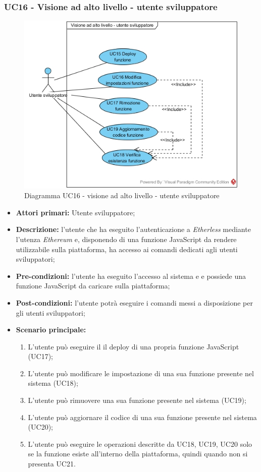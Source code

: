 \subsubsection{UC16 - Visione ad alto livello - utente sviluppatore}
\begin{figure}[h]
	\centering
	\includegraphics[width=\linewidth]{res/img/utenteSviluppatore.jpg}
	\caption{Diagramma UC16 - visione ad alto livello - utente sviluppatore}
\end{figure}
\begin{itemize}
	\item \textbf{Attori primari:} Utente sviluppatore;
	\item \textbf{Descrizione:} l'utente che ha eseguito l'autenticazione a \textit{Etherless} mediante l'utenza \textit{Ethereum\glo} e, disponendo di una funzione JavaScript da rendere utilizzabile sulla piattaforma, ha accesso ai comandi dedicati agli utenti sviluppatori;
	\item \textbf{Pre-condizioni:} l'utente ha eseguito l'accesso al sistema e e possiede una funzione JavaScript da caricare sulla piattaforma;
	\item \textbf{Post-condizioni:} l'utente potrà eseguire i comandi messi a disposizione per gli utenti sviluppatori;
	\item \textbf{Scenario principale:}
	\begin{enumerate}
		\item L'utente può eseguire il il deploy di una propria funzione JavaScript (UC17);
		\item L'utente può modificare le impostazione di una sua funzione presente nel sistema (UC18);
		\item L'utente può rimuovere una sua funzione presente nel sistema (UC19);
		\item L'utente può aggiornare il codice di una sua funzione presente nel sistema (UC20);
		\item L'utente può eseguire le operazioni descritte da UC18, UC19, UC20 solo se la funzione esiste all'interno della piattaforma, quindi quando non si presenta UC21.
	\end{enumerate}
\end{itemize}
